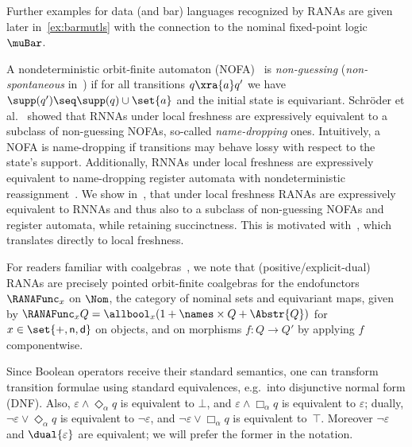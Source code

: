 \documentclass[10pt, final, conference, a4paper, twocolumn]{IEEEtran}
\begin{document}
Further examples for data (and bar) languages recognized by RANAs are given later in~\cref{ex:barmutls}
with the connection to the nominal fixed-point logic $\muBar$.

\begin{rem}
  A nondeterministic orbit-finite automaton (NOFA)~\cite{BojanczykEA14} is
  \emph{non-guessing} (\emph{non-spontaneous} in~\cite{skmw17}) if
  for all transitions $q \xra{a} q'$ we have $\supp(q') \seq \supp(q) \cup \set{a}$
  and the initial state is equivariant. Schröder et al.~\cite{skmw17}
  showed that RNNAs under local freshness are expressively equivalent
  to a subclass of non-guessing NOFAs, so-called \emph{name-dropping} ones.
  Intuitively, a NOFA is name-dropping if transitions may behave lossy
  with respect to the state's support. Additionally, RNNAs under local freshness
  are expressively equivalent to name-dropping register automata with nondeterministic
  reassignment~\cite{KaminskiZeitlin10}.
  We show in~, that under local freshness RANAs are
  expressively equivalent to RNNAs and thus also to
  a subclass of non-guessing NOFAs and register automata, while retaining succinctness.
  This is motivated with~, which translates directly to
  local freshness.
\end{rem}

\begin{rem}\label{rem:rana:coalg}
  For readers familiar with coalgebras~\cite{Rutten00}, we note that (positive/explicit-dual) RANAs are precisely
  pointed orbit-finite coalgebras for the endofunctors $\RANAFunc_x$ 
  on $\Nom$, the category of nominal sets and equivariant maps, given by $\RANAFunc_x Q =
  \allbool_x(1 + \names \times Q + \Abstr{Q})$ for $x \in \set{+,\mathsf{n},\mathsf{d}}$
  on objects, and on morphisms $f\colon Q\to Q'$ by applying $f$ componentwise.
\end{rem}

\begin{rem}\label{rem:ranadefn}
  Since Boolean operators receive their standard
  semantics, one can transform transition formulae using standard
  equivalences, e.g.~into disjunctive normal form (DNF). Also,
  $\varepsilon \wedge \Diamond_\alpha q$ is equivalent to $\bot$, and
  $\varepsilon \wedge \Box_\alpha q$ is equivalent to $\varepsilon$;
  dually, $\neg\varepsilon\vee\Diamond_\alpha q$ is equivalent to
  $\neg\varepsilon$, and $\neg\varepsilon\vee\Box_\alpha q$ is
  equivalent to~$\top$. Moreover $\neg\varepsilon$ and
  $\dual{\varepsilon}$ are equivalent; we will prefer the former in
  the notation.
\end{rem}
\end{document}
